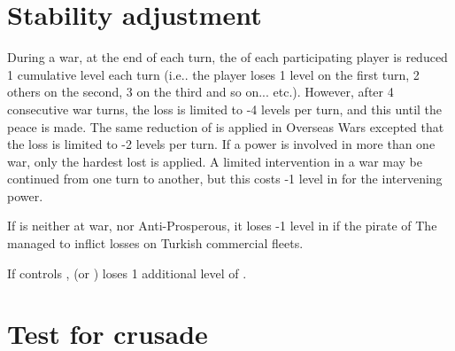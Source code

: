 \section{Stability adjustment}\label{chPeace:Stability}
During a war, at the end of each turn, the \STAB of each participating player
is reduced 1 cumulative level each turn (i.e.. the player loses 1 level on the
first turn, 2 others on the second, 3 on the third and so
on... etc.). However, after 4 consecutive war turns, the loss is limited to -4
levels per turn, and this until the peace is made.
The same reduction of \STAB is applied in Overseas Wars excepted that the loss
is limited to -2 levels per turn.
 If a power is involved in more than one war, only the
hardest lost is applied.
A limited intervention in a war may be continued from one turn to another, but
this costs -1 level in \STAB for the intervening power.

If \TUR is neither at war, nor Anti-Prosperous, it loses -1 level in \STAB if
the pirate of The  managed to inflict losses on Turkish
commercial fleets.

\aparag[\villeVienne]
If \TUR controls \villeVienne, \HAB (\SPA or \AUS) loses 1 additional level of
\STAB.

\section{Test for crusade}\label{chPeace:Crusade}

